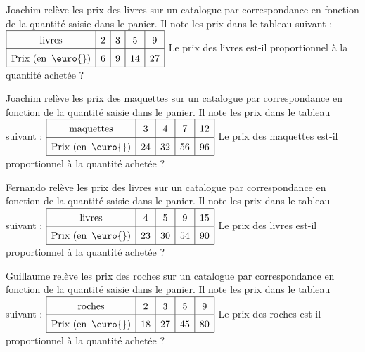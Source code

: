 \item Joachim relève les prix des livres sur un catalogue par correspondance en fonction de la quantité saisie dans le panier. Il note les prix dans le tableau suivant :
$\def\arraystretch{1.5}\begin{array}{|c|c|c|c|c|c|}\hline  \text{livres}&2&3&5&9\\
\hline \text{Prix (en $\,\euro{}$})&6&9&14&27\\
\hline\end{array}$
Le prix des livres est-il proportionnel à la quantité achetée ?\\

\item Joachim relève les prix des maquettes sur un catalogue par correspondance en fonction de la quantité saisie dans le panier. Il note les prix dans le tableau suivant :
$\def\arraystretch{1.5}\begin{array}{|c|c|c|c|c|c|}\hline  \text{maquettes}&3&4&7&12\\
\hline \text{Prix (en $\,\euro{}$})&24&32&56&96\\
\hline\end{array}$
Le prix des maquettes est-il proportionnel à la quantité achetée ?\\

\item Fernando relève les prix des livres sur un catalogue par correspondance en fonction de la quantité saisie dans le panier. Il note les prix dans le tableau suivant :
$\def\arraystretch{1.5}\begin{array}{|c|c|c|c|c|c|}\hline  \text{livres}&4&5&9&15\\
\hline \text{Prix (en $\,\euro{}$})&23&30&54&90\\
\hline\end{array}$
Le prix des livres est-il proportionnel à la quantité achetée ?\\

\item Guillaume relève les prix des roches sur un catalogue par correspondance en fonction de la quantité saisie dans le panier. Il note les prix dans le tableau suivant :
$\def\arraystretch{1.5}\begin{array}{|c|c|c|c|c|c|}\hline  \text{roches}&2&3&5&9\\
\hline \text{Prix (en $\,\euro{}$})&18&27&45&80\\
\hline\end{array}$
Le prix des roches est-il proportionnel à la quantité achetée ?\\

